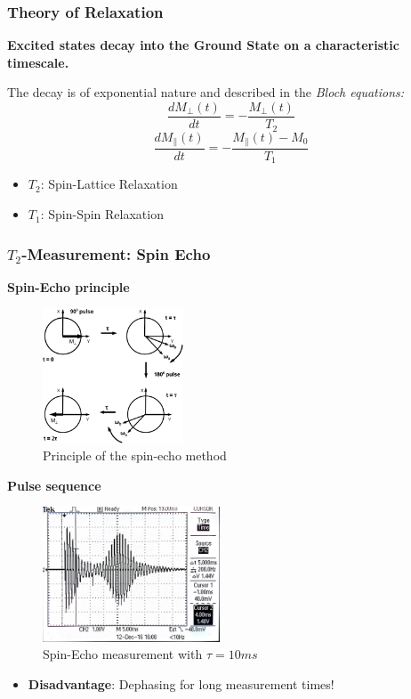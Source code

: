\documentclass[aspectratio=169]{beamer}
\begin{document}
\begin{frame}
	\frametitle{Theory of Relaxation}
	\textbf{Excited states decay into the Ground State on a characteristic timescale.}
	
	The decay is of exponential nature and described in the \textit{Bloch equations:}
	\begin{equation}
	\frac{dM_{\perp}(t)}{dt} = - \frac{M_{\perp}(t)}{T_2}
	\end{equation}
	\begin{equation}
	\frac{dM_{\parallel}(t)}{dt} = - \frac{M_{\parallel}(t) - M_0}{T_1}
	\end{equation}
	
	\begin{itemize}
		\item $T_2$: Spin-Lattice Relaxation
		\item $T_1$: Spin-Spin Relaxation
	\end{itemize}
\end{frame}

\begin{frame}
	\frametitle{$T_2$-Measurement: Spin Echo}
	\begin{minipage}[t]{0.45\textwidth}
		\centering
		\textbf{Spin-Echo principle}
		\begin{figure}
			\includegraphics[height=40mm]{./Resources/spin_ech_schematic.png}
			\caption{Principle of the spin-echo method}
			\label{fig:spinecho_bloch}
		\end{figure}
	\end{minipage}
	\hfill
	\begin{minipage}[t]{0.45\textwidth}
		\centering
		\textbf{Pulse sequence}
		\begin{figure}
			\includegraphics[height=40mm]{./Resources/spinecho_osci.jpg}
			\caption{Spin-Echo measurement with $\tau=10ms$}
			\label{fig:spinecho_osci}
		\end{figure}
	\end{minipage}
	\begin{itemize}
		\item \textbf{Disadvantage}: Dephasing for long measurement times!
	\end{itemize}
\end{frame}
\end{document}
